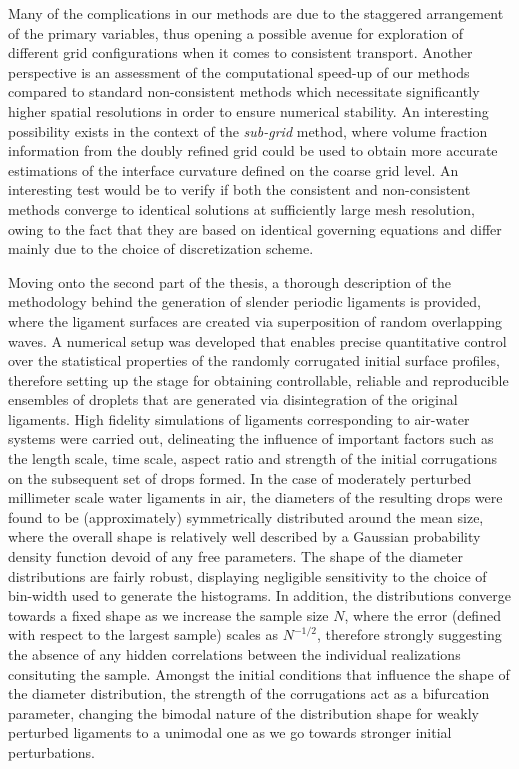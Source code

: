 Many of the complications in our methods are due to the staggered arrangement of the primary variables, 
thus opening a possible avenue for exploration of different grid configurations when it comes to consistent transport.
Another perspective is an assessment of the computational speed-up 
of our methods compared to standard non-consistent methods which necessitate 
significantly higher spatial resolutions in order to ensure numerical stability.  
An interesting possibility exists in the context of the \textit{sub-grid} method, 
where volume fraction information from the doubly refined grid could be used to
obtain more accurate estimations of the interface curvature defined on the coarse grid level. 
An interesting test would be to verify if both the consistent and non-consistent methods
converge to identical solutions at sufficiently large mesh resolution, owing to the fact that they 
are based on identical governing equations and differ mainly due to the choice of discretization scheme. 


Moving onto the second part of the thesis, a thorough description of the 
methodology behind the generation of slender periodic ligaments is provided, 
where the ligament surfaces are created via superposition of random overlapping waves.
A numerical setup was developed that enables precise quantitative control over the 
statistical properties of the randomly corrugated initial surface profiles, 
therefore setting up the stage for obtaining controllable, reliable and reproducible 
ensembles of droplets that are generated via disintegration of the original ligaments.
High fidelity simulations of ligaments corresponding to air-water systems were carried out,
delineating the influence of important factors such as the length scale, time scale, 
aspect ratio and strength of the initial corrugations on the subsequent set of drops formed.  
In the case of moderately perturbed millimeter scale water ligaments in air, 
the diameters of the resulting drops were found to be (approximately) symmetrically 
distributed around the mean size, where the overall shape is relatively well described by 
a Gaussian probability density function devoid of any free parameters.
The shape of the diameter distributions are fairly robust, displaying negligible sensitivity
to the choice of bin-width used to generate the histograms.
In addition, the distributions converge towards a fixed shape as we increase the sample size $N$, 
where the error (defined with respect to the largest sample) scales as $N^{-1/2}$, therefore strongly 
suggesting the absence of any hidden correlations between the individual realizations consituting the sample. 
Amongst the initial conditions that influence the shape of the diameter distribution, the strength of 
the corrugations act as a bifurcation parameter, changing the bimodal nature of the distribution shape for 
weakly perturbed ligaments to a unimodal one as we go towards stronger initial perturbations.  

